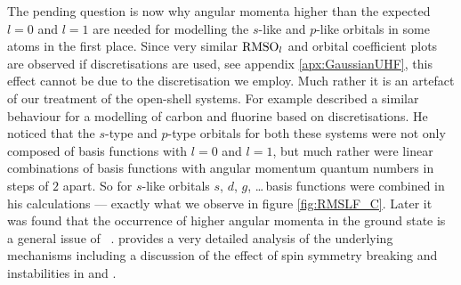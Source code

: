 
\label{sec:IssuesUHF}
The pending question is now why angular momenta higher than the expected
$l=0$ and $l=1$ are needed for modelling the $s$-like and $p$-like orbitals
in some atoms in the first place.
Since very similar $\text{RMSO}_l$ and \RMS orbital coefficient plots
are observed if \cGTO discretisations are used, see appendix \vref{apx:GaussianUHF},
this effect cannot be due to the \CS discretisation we employ.
Much rather it is an artefact of our \UHF treatment of the open-shell systems.
For example \citet{Cook1981} described a similar behaviour
for a \UHF modelling of carbon and fluorine
based on \cGTO discretisations.
He noticed that the $s$-type and $p$-type \SCF orbitals
for both these systems were not only
composed of \cGTO basis functions with $l=0$ and $l=1$,
but much rather were linear combinations of basis functions with
angular momentum quantum numbers in steps of $2$ apart.
So for $s$-like \SCF orbitals $s$, $d$, $g$, \ldots \,basis functions
were combined in his calculations ---
exactly what we observe in figure \ref{fig:RMSLF_C}.
Later it was found that the occurrence of higher angular momenta in
the ground state is a general issue of
\UHF~\cite{Fukutome1981,Cook1984,McWeeny1985}.
\citet{Fukutome1981} provides a very detailed analysis of the
underlying mechanisms including a discussion of the effect of
spin symmetry breaking and \HF instabilities in \UHF and \GUHF.

